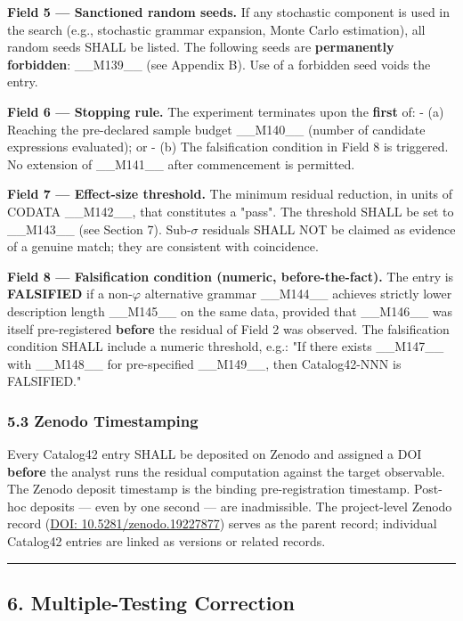 \textbf{Field 5 --- Sanctioned random seeds.} If any stochastic component is used in the search (e.g., stochastic grammar expansion, Monte Carlo estimation), all random seeds SHALL be listed. The following seeds are \textbf{permanently forbidden}: \_\_M139\_\_ (see Appendix B). Use of a forbidden seed voids the entry.

\textbf{Field 6 --- Stopping rule.} The experiment terminates upon the \textbf{first} of:
- (a) Reaching the pre-declared sample budget \_\_M140\_\_ (number of candidate expressions evaluated); or
- (b) The falsification condition in Field 8 is triggered.
No extension of \_\_M141\_\_ after commencement is permitted.

\textbf{Field 7 --- Effect-size threshold.} The minimum residual reduction, in units of CODATA \_\_M142\_\_, that constitutes a "pass". The threshold SHALL be set to \_\_M143\_\_ (see Section 7). Sub-$\sigma$ residuals SHALL NOT be claimed as evidence of a genuine match; they are consistent with coincidence.

\textbf{Field 8 --- Falsification condition (numeric, before-the-fact).} The entry is \textbf{FALSIFIED} if a non-$\varphi$ alternative grammar \_\_M144\_\_ achieves strictly lower description length \_\_M145\_\_ on the same data, provided that \_\_M146\_\_ was itself pre-registered \textbf{before} the residual of Field 2 was observed. The falsification condition SHALL include a numeric threshold, e.g.: "If there exists \_\_M147\_\_ with \_\_M148\_\_ for pre-specified \_\_M149\_\_, then Catalog42-NNN is FALSIFIED."

\subsubsection{5.3 Zenodo Timestamping}

Every Catalog42 entry SHALL be deposited on Zenodo and assigned a DOI \textbf{before} the analyst runs the residual computation against the target observable. The Zenodo deposit timestamp is the binding pre-registration timestamp. Post-hoc deposits --- even by one second --- are inadmissible. The project-level Zenodo record (\href{https://doi.org/10.5281/zenodo.19227877}{DOI: 10.5281/zenodo.19227877}) serves as the parent record; individual Catalog42 entries are linked as versions or related records.

\noindent\rule{\textwidth}{0.4pt}

\subsection{6. Multiple-Testing Correction}

